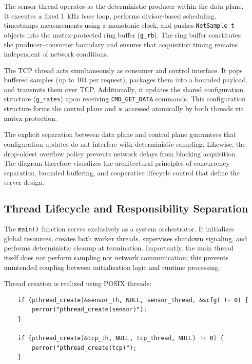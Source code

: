 The sensor thread operates as the deterministic producer within the data plane. It executes a fixed 1~kHz base loop, performs divisor-based scheduling, timestamps measurements using a monotonic clock, and pushes \texttt{NetSample\_t} objects into the mutex-protected ring buffer (\texttt{g\_rb}). The ring buffer constitutes the producer--consumer boundary and ensures that acquisition timing remains independent of network conditions.

The TCP thread acts simultaneously as consumer and control interface. It pops buffered samples (up to 104 per request), packages them into a bounded payload, and transmits them over TCP. Additionally, it updates the shared configuration structure (\texttt{g\_rates}) upon receiving \texttt{CMD\_GET\_DATA} commands. This configuration structure forms the control plane and is accessed atomically by both threads via mutex protection.

The explicit separation between data plane and control plane guarantees that configuration updates do not interfere with deterministic sampling. Likewise, the drop-oldest overflow policy prevents network delays from blocking acquisition. The diagram therefore visualizes the architectural principles of concurrency separation, bounded buffering, and cooperative lifecycle control that define the server design.

\subsection{Thread Lifecycle and Responsibility Separation}
\label{subsec:thread-lifecycle}

The \texttt{main()} function serves exclusively as a system orchestrator. It initializes global resources, creates both worker threads, supervises shutdown signaling, and performs deterministic cleanup at termination. Importantly, the main thread itself does not perform sampling nor network communication; this prevents unintended coupling between initialization logic and runtime processing.

Thread creation is realized using POSIX threads:

\begin{lstlisting}
	if (pthread_create(&sensor_th, NULL, sensor_thread, &scfg) != 0) {
		perror("pthread_create(sensor)");
	}
	
	if (pthread_create(&tcp_th, NULL, tcp_thread, NULL) != 0) {
		perror("pthread_create(tcp)");
	}
\end{lstlisting}

